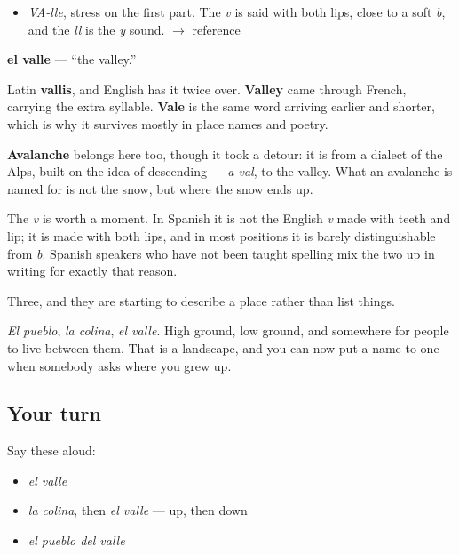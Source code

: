 \begin{sounds}
\begin{itemize}
\raggedright
  \item \emph{VA-lle}, stress on the first part. The \emph{v} is said with both lips, close to a soft \emph{b}, and the \emph{ll} is the \emph{y} sound. $\to$ reference
\end{itemize}
\end{sounds}

\begin{cousinweb}
\textbf{el valle} — \textquotedblleft{}the valley.\textquotedblright{}

Latin \textbf{vallis}, and English has it twice over. \textbf{Valley} came through French, carrying the extra syllable. \textbf{Vale} is the same word arriving earlier and shorter, which is why it survives mostly in place names and poetry.

\textbf{Avalanche} belongs here too, though it took a detour: it is from a dialect of the Alps, built on the idea of descending — \emph{a val}, to the valley. What an avalanche is named for is not the snow, but where the snow ends up.

The \emph{v} is worth a moment. In Spanish it is not the English \emph{v} made with teeth and lip; it is made with both lips, and in most positions it is barely distinguishable from \emph{b}. Spanish speakers who have not been taught spelling mix the two up in writing for exactly that reason.
\end{cousinweb}

\begin{grammarlens}[title={What you've built}]
Three, and they are starting to describe a place rather than list things.

\emph{El pueblo}, \emph{la colina}, \emph{el valle}. High ground, low ground, and somewhere for people to live between them. That is a landscape, and you can now put a name to one when somebody asks where you grew up.
\end{grammarlens}

\subsection*{Your turn}
Say these aloud:

\begin{itemize}
\raggedright
  \item \emph{el valle}
  \item \emph{la colina}, then \emph{el valle} — up, then down
  \item \emph{el pueblo del valle}
\end{itemize}

